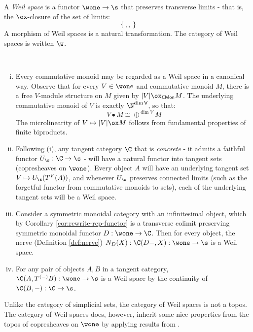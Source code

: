 \begin{definition}%
	\label{def:weil-space}
	A \emph{Weil space} is a functor $\wone \to \s$ that preserves transverse limits - that is, the $\ox$-closure of the set of limits:
	\[
		\left\{
		
		,
		
		,
		
		\right\}
	\]
	A morphism of Weil spaces is a natural transformation. The category of Weil spaces is written $\w$.
\end{definition}
\begin{example}
	~\begin{enumerate}[(i)]
		\item Every commutative monoid may be regarded as a Weil space in a canonical way.
		      Observe that for every $V \in \wone$ and commutative monoid $M$, there is a free $V$-module structure on $M$ given by $|V| \ox_{\mathsf{CMon}} M$. The underlying commutative monoid of $V$ is exactly $\N^{\mathsf{\dim V}}$, so that:
		      \[
			      V \bullet M \cong \oplus^{\dim V} M
		      \]
		      The microlinearity of $V \mapsto |V| \ox M$ follows from fundamental properties of finite biproducts.
		\item Following (i), any tangent category $\C$ that is \emph{concrete} - it admits a faithful functor $U_\s: \C \to \s$ - will have a natural functor into tangent sets (copresheaves on $\wone$). Every object $A$ will have an underlying tangent set $V \mapsto U_{\s}(T^V(A))$, and whenever $U_\s$ preserves connected limits (such as the forgetful functor from commutative monoids to sets), each of the underlying tangent sets will be a Weil space.
		\item Consider a symmetric monoidal category with an infinitesimal object, which by Corollary \ref{cor:rewrite-rep-functor} is a transverse colimit preserving symmetric monoidal functor $D:\wone \to \C$. Then for every object, the nerve (Definition \ref{def:nerve}) $N_D(X): \C(D-,X):\wone \to \s$ is a Weil space.
		\item For any pair of objects $A,B$ in a tangent category, $\C(A,T^{(-)}B):\wone \to \s$ is a Weil space by the continuity of $\C(B,-):\C \to \s$.
	\end{enumerate}
\end{example}
Unlike the category of simplicial sets, the category of Weil spaces is not a topos.
The category of Weil spaces does, however, inherit some nice properties from the topos of copresheaves on $\wone$ by applying results from .
